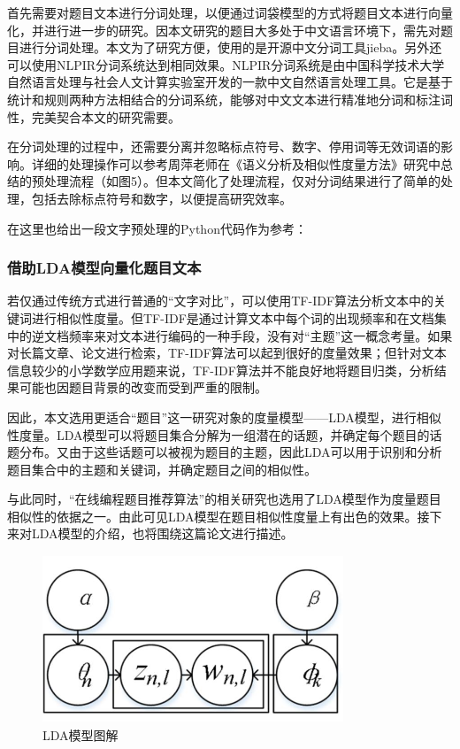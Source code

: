 首先需要对题目文本进行分词处理，以便通过词袋模型的方式将题目文本进行向量化，并进行进一步的研究。因本文研究的题目大多处于中文语言环境下，需先对题目进行分词处理。本文为了研究方便，使用的是开源中文分词工具jieba。另外还可以使用NLPIR分词系统达到相同效果。NLPIR分词系统是由中国科学技术大学自然语言处理与社会人文计算实验室开发的一款中文自然语言处理工具。它是基于统计和规则两种方法相结合的分词系统，能够对中文文本进行精准地分词和标注词性，完美契合本文的研究需要。

在分词处理的过程中，还需要分离并忽略标点符号、数字、停用词等无效词语的影响。详细的处理操作可以参考周萍老师在《语义分析及相似性度量方法》\cite{ZhouJiYuYuYiFenXiDeWenBenXiangSiXingDuLiangYanJiuJiYingYong2017}研究中总结的预处理流程（如图5）。但本文简化了处理流程，仅对分词结果进行了简单的处理，包括去除标点符号和数字，以便提高研究效率。

在这里也给出一段文字预处理的Python代码作为参考：

\begin{mgCodeBlock}
\end{mgCodeBlock}

\subsubsection{借助LDA模型向量化题目文本}

若仅通过传统方式进行普通的“文字对比”，可以使用TF-IDF算法分析文本中的关键词进行相似性度量。但TF-IDF是通过计算文本中每个词的出现频率和在文档集中的逆文档频率来对文本进行编码的一种手段，没有对“主题”这一概念考量。如果对长篇文章、论文进行检索，TF-IDF算法可以起到很好的度量效果；但针对文本信息较少的小学数学应用题来说，TF-IDF算法并不能良好地将题目归类，分析结果可能也因题目背景的改变而受到严重的限制。

因此，本文选用更适合“题目”这一研究对象的度量模型——LDA模型，进行相似性度量。LDA模型可以将题目集合分解为一组潜在的话题，并确定每个题目的话题分布。又由于这些话题可以被视为题目的主题，因此LDA可以用于识别和分析题目集合中的主题和关键词，并确定题目之间的相似性。

与此同时，“在线编程题目推荐算法”的相关研究\cite{LuoRongHeZhiShiDianYuTuJuanJiDeZaiXianBianChengTiMuTuiJianSuanFa}也选用了LDA模型作为度量题目相似性的依据之一。由此可见LDA模型在题目相似性度量上有出色的效果。接下来对LDA模型的介绍，也将围绕这篇论文进行描述。

\begin{figure}[htbp]
    \centering
    \label{photo041942}
    \includegraphics[width=9cm,height=5cm]{res/LDA.jpg}
    \caption{LDA模型图解}
\end{figure} 

